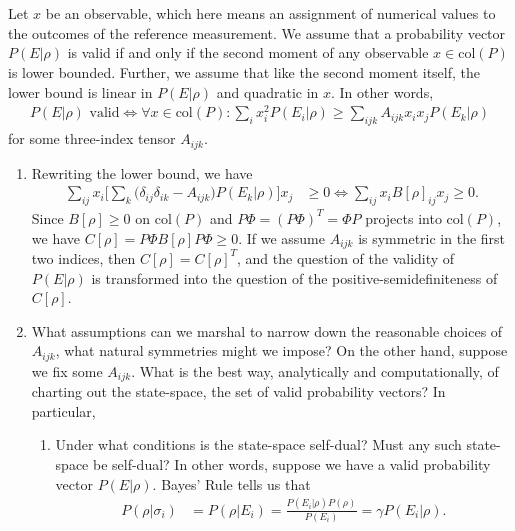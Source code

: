 \documentclass[11pt]{article}
\begin{document}
\section{}
 Let $x$ be an observable, which here means an assignment of numerical values to the outcomes of the reference measurement. We assume that a probability vector $P(E|\rho)$ is valid if and only if the second moment of any observable $x\in \text{col}(P)$ is lower bounded. Further, we assume that like the second moment itself, the lower bound is linear in $P(E|\rho)$ and quadratic in $x$. In other words,
\begin{align}
P(E|\rho) \text{ valid}	\Longleftrightarrow \forall x\in \text{col}(P): \sum_i x_i^2P(E_i|\rho)\ge \sum_{ijk} A_{ijk}x_ix_jP(E_k|\rho)
\end{align}
for some three-index tensor $A_{ijk}$.
\begin{enumerate}
\item Rewriting the lower bound, we have 
\begin{align}
\sum_{ij}x_i\Bigg[\sum_k \Big(\delta_{ij}\delta_{ik}-A_{ijk}\Big)P(E_k|\rho)\Bigg]x_j&\ge0	\Longleftrightarrow \sum_{ij}x_iB[\rho]_{ij}x_j\ge0.
\end{align}
Since $B[\rho]\ge0$ on $\text{col}(P)$ and $P\Phi=(P\Phi)^T=\Phi P$ projects into $\text{col}(P)$, we have $C[\rho]=P\Phi B[\rho]P\Phi\ge0$. If we assume $A_{ijk}$ is symmetric in the first two indices, then $C[\rho]=C[\rho]^T$, and  the question of the validity of $P(E|\rho)$ is transformed into the question of the positive-semidefiniteness of $C[\rho]$.
 \item What assumptions can we marshal to narrow down the reasonable choices of $A_{ijk}$, what natural symmetries might we impose? On the other hand, suppose we fix some $A_{ijk}$. What is the best way, analytically and computationally, of charting out the state-space, the set of valid probability vectors? In particular, 
 \begin{enumerate}
 \item Under what conditions is the state-space self-dual? Must any such state-space be self-dual? In other words, suppose we have a valid probability vector $P(E|\rho)$. Bayes' Rule tells us that 
\begin{align}
P(\rho|\sigma_i) &= P(\rho|E_i)= 	\frac{P(E_i|\rho)P(\rho)}{P(E_i)}=\gamma P(E_i|\rho).
\end{align}


\end{enumerate}
\end{enumerate}
\end{document}
